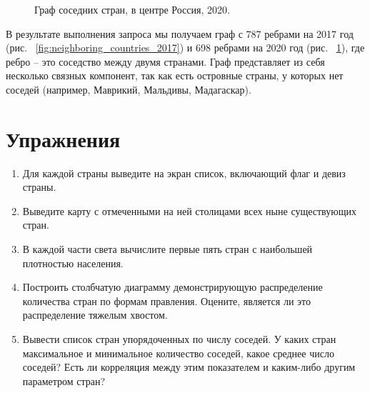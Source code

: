 \begin{figure}
	{
		\setlength{\fboxsep}{0pt}%
		\setlength{\fboxrule}{1pt}%
	}
	\caption{Граф соседних стран, в центре Россия, 2020.
	}%
	\label{fig:neighboring_countries_2020}%
\end{figure}

В результате выполнения запроса мы получаем граф с 787 ребрами на 2017 год (рис. ~\ref{fig:neighboring_countries_2017}) и 698 ребрами на 2020 год (рис. ~\ref{fig:neighboring_countries_2020}), где ребро – это соседство между двумя странами. Граф представляет из себя несколько связных компонент, так как есть островные страны, у которых нет соседей (например, Маврикий, Мальдивы, Мадагаскар).

\section{Упражнения}

\begin{enumerate}
	\item Для каждой страны выведите на экран список, включающий флаг и девиз страны.
	\item Выведите карту с отмеченными на ней столицами всех ныне существующих стран.
	\item В каждой части света вычислите первые пять стран с наибольшей плотностью населения.
	\item Построить столбчатую диаграмму демонстрирующую распределение количества стран по формам правления. Оцените, является ли это распределение тяжелым хвостом.
	\item Вывести список стран упорядоченных по числу соседей. У каких стран максимальное и минимальное количество соседей, какое среднее число соседей? Есть ли корреляция между этим показателем и каким-либо другим параметром стран?
\end{enumerate}